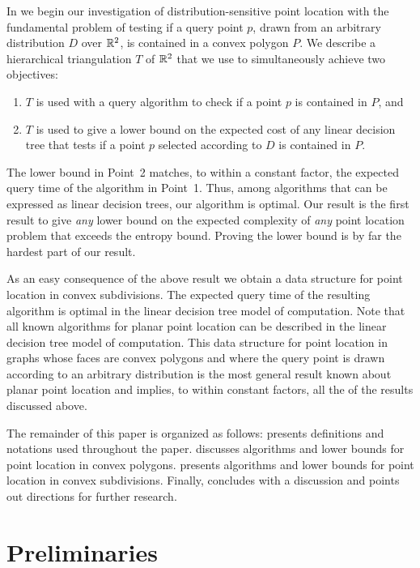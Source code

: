 \documentclass[charterfonts,lotsofwhite]{patmorin}
\begin{document}
In we
begin our investigation of distribution-sensitive point location 
with the fundamental problem of testing if a query point
$p$, drawn from an arbitrary distribution $D$ over $\mathbb{R}^2$, is
contained in a convex polygon $P$.  We describe a hierarchical
triangulation $T$ of $\mathbb{R}^2$ that we use to simultaneously achieve two
objectives:
\begin{enumerate}
\item $T$ is used with a query algorithm to check if a point $p$ 
	is contained in $P$, and
\item $T$ is used to give a lower bound on the expected cost of
	any linear decision tree that tests if a point $p$ selected
	according to $D$ is contained in $P$.
\end{enumerate}
The lower bound in Point~2 matches, to within a constant factor, the
expected query time of the algorithm in Point~1.  Thus, among
algorithms that can be expressed as linear decision trees, our
algorithm is optimal. Our result is the first result to give
\emph{any} lower bound on the expected complexity of \emph{any} point
location problem that exceeds the entropy bound. Proving the lower
bound is by far the hardest part of our result.  

As an easy consequence of the above result we obtain a data structure
for point location in convex subdivisions.  The expected query time of
the resulting algorithm is optimal in the linear decision tree model
of computation. Note that all known algorithms for planar point
location can be described in the linear decision tree model of
computation.  This data structure for point location in graphs whose
faces are convex polygons and where the query point is drawn according
to an arbitrary distribution is the most general result known about
planar point location and implies, to within constant factors, all the
of the results discussed above.

The remainder of this paper is organized as follows:  
presents definitions and notations used throughout the paper.
 discusses algorithms and lower bounds for point
location in convex polygons.   presents algorithms
and lower bounds for point location in convex subdivisions.  Finally,
 concludes with a discussion and points out
directions for further research.


\section{Preliminaries}
\end{document}
